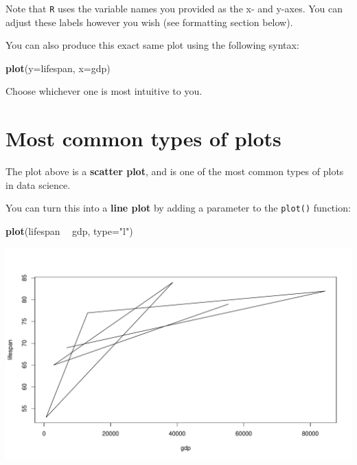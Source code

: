 \documentclass[
]{book}
\newenvironment{Shaded}{\begin{snugshade}}{\end{snugshade}}
\newcommand{\DataTypeTok}[1]{\textcolor[rgb]{0.13,0.29,0.53}{#1}}
\newcommand{\KeywordTok}[1]{\textcolor[rgb]{0.13,0.29,0.53}{\textbf{#1}}}
\newcommand{\NormalTok}[1]{#1}
\newcommand{\OperatorTok}[1]{\textcolor[rgb]{0.81,0.36,0.00}{\textbf{#1}}}
\newcommand{\StringTok}[1]{\textcolor[rgb]{0.31,0.60,0.02}{#1}}
\begin{document}
Note that \texttt{R} uses the variable names you provided as the x- and y-axes. You can adjust these labels however you wish (see formatting section below).

You can also produce this exact same plot using the following syntax:

\begin{Shaded}
\begin{Highlighting}[]
\KeywordTok{plot}\NormalTok{(}\DataTypeTok{y=}\NormalTok{lifespan, }\DataTypeTok{x=}\NormalTok{gdp)}
\end{Highlighting}
\end{Shaded}

Choose whichever one is most intuitive to you.

\hypertarget{most-common-types-of-plots}{%
\section*{Most common types of plots}\label{most-common-types-of-plots}}

The plot above is a \textbf{scatter plot}, and is one of the most common types of plots in data science.

You can turn this into a \textbf{line plot} by adding a parameter to the \texttt{plot()} function:

\begin{Shaded}
\begin{Highlighting}[]
\KeywordTok{plot}\NormalTok{(lifespan }\OperatorTok{~}\StringTok{ }\NormalTok{gdp, }\DataTypeTok{type=}\StringTok{"l"}\NormalTok{)}
\end{Highlighting}
\end{Shaded}

\includegraphics{figures/unnamed-chunk-100-1.pdf}
\end{document}
